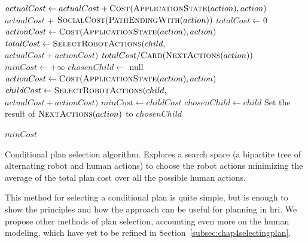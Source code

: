 \documentclass[a4paper,11pt,twoside]{StyleThese}
\begin{document}
\begin{algorithm}[htb]
\begin{algorithmic}[1]
 
	\State $actualCost \leftarrow actualCost + \textsc{Cost}(\textsc{ApplicationState}(action), action)$
	\State \Return $actualCost$ + $\textsc{SocialCost}(\textsc{PathEndingWith}(action))$
\EndIf
{} 
	\State $totalCost \leftarrow 0$
	\State $actionCost \leftarrow \textsc{Cost}(\textsc{ApplicationState}(action), action)$
		\State $totalCost \leftarrow \textsc{SelectRobotActions}(child,$\\
		\hfill$actualCost + actionCost)$
	\EndFor
	\State \Return $totalCost / \textsc{Card}(\textsc{NextActions}(action))$
\Else{} 
	\State $minCost \leftarrow +\infty$
	\State $chosenChild \leftarrow$ null
	\State $actionCost \leftarrow \textsc{Cost}(\textsc{ApplicationState}(action), action)$
		\State $childCost \leftarrow \textsc{SelectRobotActions}(child,$\\
		 \hfill$actualCost + actionCost)$
			\State $minCost \leftarrow childCost$
			\State $chosenChild \leftarrow child$
		\EndIf
	\EndFor
	\State Set the result of $\textsc{NextActions}(action)$ to $chosenChild$
	
	\State \Return $minCost$	
\EndIf
\EndFunction
	
\end{algorithmic}
 \caption{Conditional plan selection algorithm. Explores a search space (a bipartite tree of alternating robot and human actions) to choose the robot actions minimizing the average of the total plan cost over all the possible human actions.}
 \label{alg:minaverage}
\end{algorithm}

This method for selecting a conditional plan is quite simple, but is enough to show the principles and how the approach can be useful for planning in \acrshort{hri}. We propose other methods of plan selection, accounting even more on the human modeling, which have yet to be refined in Section~\ref{subsec:chap4selectingplan}.
\end{document}
